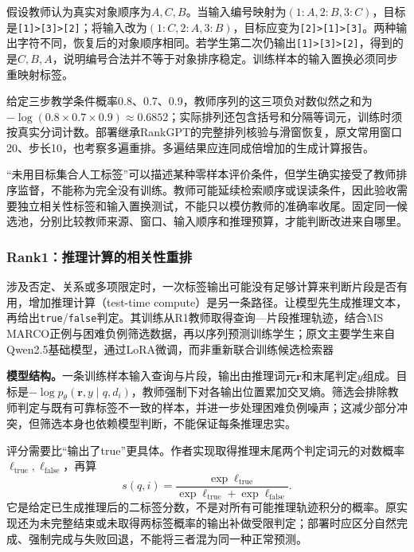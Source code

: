 假设教师认为真实对象顺序为$A,C,B$。当输入编号映射为$(1:A,2:B,3:C)$，目标是\texttt{[1]>[3]>[2]}；将输入改为$(1:C,2:A,3:B)$，目标应变为\texttt{[2]>[1]>[3]}。两种输出字符不同，恢复后的对象顺序相同。若学生第二次仍输出\texttt{[1]>[3]>[2]}，得到的是$C,B,A$，说明编号合法并不等于对象排序稳定。训练样本的输入置换必须同步重映射标签。

给定三步教学条件概率0.8、0.7、0.9，教师序列的这三项负对数似然之和为$-\log(0.8\times0.7\times0.9)\approx0.6852$；实际排列还包含括号和分隔等词元，训练时须按真实分词计数。部署继承RankGPT的完整排列核验与滑窗恢复，原文常用窗口20、步长10，也考察多遍重排。多遍结果应连同成倍增加的生成计算报告。

“未用目标集合人工标签”可以描述某种零样本评价条件，但学生确实接受了教师排序监督，不能称为完全没有训练。教师可能延续检索顺序或误读条件，因此验收需要独立相关性标签和输入置换测试，不能只以模仿教师的准确率收尾。固定同一候选池，分别比较教师来源、窗口、输入顺序和推理预算，才能判断改进来自哪里。

\Needspace{100mm}
\subsubsection{Rank1：推理计算的相关性重排}
\label{sec:rs-search-rank1}

涉及否定、关系或多项限定时，一次标签输出可能没有足够计算来判断片段是否有用，增加推理计算（test-time compute）是另一条路径。让模型先生成推理文本，再给出\texttt{true}/\texttt{false}判定。其训练从R1教师取得查询—片段推理轨迹，结合MS MARCO正例与困难负例筛选数据，再以序列预测训练学生；原文主要学生来自Qwen2.5基础模型，通过LoRA微调，而非重新联合训练候选检索器

\textbf{模型结构。}一条训练样本输入查询与片段，输出由推理词元$\bm r$和末尾判定$y$组成。目标是$-\log p_\theta(\bm r,y\mid q,d_i)$，教师强制下对各输出位置累加交叉熵。筛选会排除教师判定与既有可靠标签不一致的样本，并进一步处理困难负例噪声；这减少部分冲突，但筛选本身也依赖模型判断，不能保证每条推理忠实。

评分需要比“输出了true”更具体。作者实现取得推理末尾两个判定词元的对数概率$\ell_{\mathrm{true}},\ell_{\mathrm{false}}$，再算
\begin{equation}
 s(q,i)=\frac{\exp\ell_{\mathrm{true}}}
 {\exp\ell_{\mathrm{true}}+\exp\ell_{\mathrm{false}}}.
 \label{eq:rs-search-rank1}
\end{equation}
它是给定已生成推理后的二标签分数，不是对所有可能推理轨迹积分的概率。原实现还为未完整结束或未取得两标签概率的输出补做受限判定；部署时应区分自然完成、强制完成与失败回退，不能将三者混为同一种正常预测。


